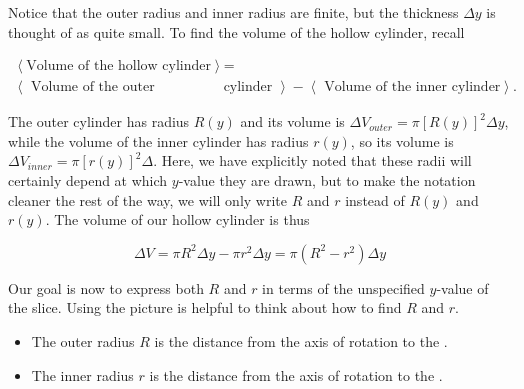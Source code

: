 \documentclass{ximera}
\begin{document}
\begin{model}
\begin{image}
            \end{image}

Notice that the outer radius and inner radius are finite, but the thickness $\Delta y$ is thought of as quite small.  To find the volume of the hollow cylinder, recall

\begin{align*}
\left< \textrm{Volume of the hollow cylinder} \right>  &=   \\
 \left< \textrm{ Volume of the outer} \right. & \left. \textrm{cylinder } \right> - \left< \textrm{ Volume of the inner cylinder} \right>.
\end{align*}
 
The outer cylinder has radius $R(y)$ and its volume is $\Delta V_{outer} = \pi [R(y)]^2 \Delta y$, while the volume of the inner cylinder has radius $r(y)$, so its volume is $\Delta V_{inner} = \pi [r(y)]^2 \Delta$.  Here, we have explicitly noted that these radii will certainly depend at which $y$-value they are drawn, but to make the notation cleaner the rest of the way, we will only write $R$ and $r$ instead of $R(y)$ and $r(y)$.  The volume of our hollow cylinder is thus
 
\[
\Delta V = \pi R^2 \Delta y -\pi r^2 \Delta y=\pi \left(R^2-r^2\right) \Delta y 
\]

Our goal is now to express both $R$ and $r$ in terms of the unspecified $y$-value of the slice.  Using the picture is helpful to think about how to find $R$ and $r$.

\begin{itemize}
\item The outer radius $R$ is the distance from the axis of rotation to the .
\item The inner radius $r$ is the distance from the axis of rotation to the .
\end{itemize}


\end{model}
\end{document}
